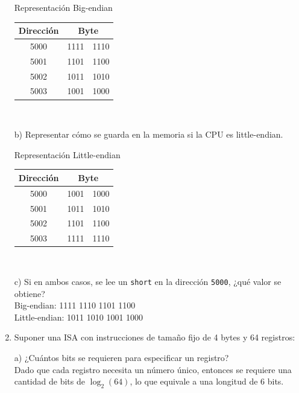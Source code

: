 \documentclass[a4paper, 11pt]{article}
\newcommand{\Aspace}{0.2cm}
\begin{document}
\begin{enumerate}
{                Representación Big-endian\\
                \begin{tabular}{|c|cc|}
                    \hline
                    \textbf{Dirección} & \multicolumn{2}{|c|}{\textbf{Byte}} \\
                    \hline
                    5000 & 1111 & 1110 \\
                    5001 & 1101 & 1100 \\
                    5002 & 1011 & 1010 \\
                    5003 & 1001 & 1000 \\
                    \hline
                \end{tabular} \\
        }

        \vspace{\Aspace} \par
        b) Representar cómo se guarda en la memoria si la CPU es little-endian.
        \\ { \color{azul} 
                Representación Little-endian\\
                \begin{tabular}{|c|cc|}
                    \hline
                    \textbf{Dirección} & \multicolumn{2}{|c|}{\textbf{Byte}} \\
                    \hline
                    5000 & 1001 & 1000 \\
                    5001 & 1011 & 1010 \\
                    5002 & 1101 & 1100 \\
                    5003 & 1111 & 1110 \\
                    \hline
                \end{tabular} \\
        }

        \vspace{\Aspace} \par
        c) Si en ambos casos, se lee un \texttt{short} en la dirección \texttt{5000}, ¿qué valor se obtiene?
        \\ { \color{azul} 
            Big-endian: 1111 1110 1101 1100 \\
            Little-endian: 1011 1010 1001 1000
        }



    \newpage
    \item Suponer una ISA con instrucciones de tamaño fijo de 4 bytes y 64 registros: \par
        \vspace{\Aspace} \par
        a) ¿Cuántos bits se requieren para especificar un registro?
        \\ { \color{azul} 
            Dado que cada registro necesita un número único, entonces se requiere una cantidad de bits de $\log_{2}(64)$, lo que equivale a una longitud de 6 bits.
        }


\end{enumerate}
\end{document}
